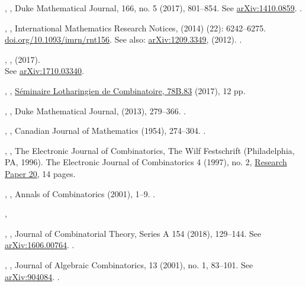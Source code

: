 \documentclass[12pt]{amsart}
\theoremstyle{plain}
\theoremstyle{definition}
\theoremstyle{remark}
\begin{document}
\begin{thebibliography}{10}
,
, 	
Duke Mathematical Journal,  166, no. 5 (2017), 801--854.
See \href{http://arxiv.org/abs/1410.0859}{arXiv:1410.0859}.  .



,
,
International Mathematics Research Notices, (2014) (22): 6242--6275. 
\href{https://doi.org/10.1093/imrn/rnt156}{doi.org/10.1093/imrn/rnt156}. See also:
\href{http://arxiv.org/abs/1209.3349}{arXiv:1209.3349}, (2012). .

,
, (2017).\\
See \href{https://arxiv.org/pdf/1710.03340}{arXiv:1710.03340}.

,
,
\href{http://www.mat.univie.ac.at/~slc/wpapers/FPSAC2017/83\%20Qiu\%20Remmel.pdf}{S\'eminaire Lotharingien de Combinatoire, 78B.83} (2017), 12 pp.

  
,
,
Duke Mathematical Journal,  (2013), 279--366. .

, 
, 
Canadian Journal of Mathematics  (1954),  274--304. .

,
,
The Electronic Journal of Combinatorics, The Wilf Festschrift (Philadelphia, PA, 1996). The Electronic Journal of Combinatorics 4 (1997), no. 2, \href{http://www.combinatorics.org/ojs/index.php/eljc/article/view/v4i2r20}{Research Paper 20}, 14 pages. 

 ,
 ,
  Annals of Combinatorics (2001), 1--9. .
  
 
 ,
 
  ,
  ,
   Journal of Combinatorial Theory, Series A 154 (2018), 129--144.  
   See \href{http://arxiv.org/abs/1606.00764}{arXiv:1606.00764}. .
  
  ,
  ,
   Journal of Algebraic Combinatorics, 13 (2001), no. 1, 83--101.
   See \href{https://arxiv.org/pdf/math/9904084.pdf}{arXiv:904084}. .

\end{thebibliography}
\end{document}
